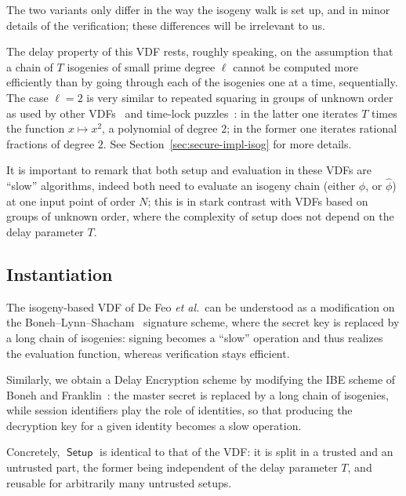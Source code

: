 \documentclass{llncs}
\DeclareMathOperator{\Setup}{\mathsf{Setup}}
\begin{document}
The two variants only differ in the way the isogeny walk is set up,
and in minor details of the verification; these differences will be
irrelevant to us.

The delay property of this VDF rests, roughly speaking, on the
assumption that a chain of $T$ isogenies of small prime degree $\ell$
cannot be computed more efficiently than by going through each of the
isogenies one at a time, sequentially. %
The case $\ell=2$ is very similar to repeated squaring in groups of
unknown order as used by other VDFs~\cite{Wesolowski,Pietrzak} and
time-lock puzzles~\cite{TLP}: in the latter one iterates $T$ times the
function $x\mapsto x^2$, a polynomial of degree $2$; in the former one
iterates rational fractions of degree $2$. %
See Section~\ref{sec:secure-impl-isog} for more details.

It is important to remark that both setup and evaluation in these VDFs
are ``slow'' algorithms, indeed both need to evaluate an isogeny chain
(either $\phi$, or $\hat\phi$) at one input point of order $N$; this
is in stark contrast with VDFs based on groups of unknown order, where
the complexity of setup does not depend on the delay parameter $T$.


\subsection{Instantiation}

The isogeny-based VDF of De Feo \emph{et al.}\ can be understood as a
modification on the Boneh--Lynn--Shacham~\cite{boneh+lynn+shacham04}
signature scheme, where the secret key is replaced by a long chain of
isogenies: signing becomes a ``slow'' operation and thus realizes the
evaluation function, whereas verification stays efficient.

Similarly, we obtain a Delay Encryption scheme by modifying the IBE
scheme of Boneh and Franklin~\cite{10.1007/3-540-44647-8_13}: the
master secret is replaced by a long chain of isogenies, while session
identifiers play the role of identities, so that producing the
decryption key for a given identity becomes a slow operation.

Concretely, $\Setup$ is identical to that of the VDF: it is split in a
trusted and an untrusted part, the former being independent of the
delay parameter $T$, and reusable for arbitrarily many untrusted
setups.
\end{document}
